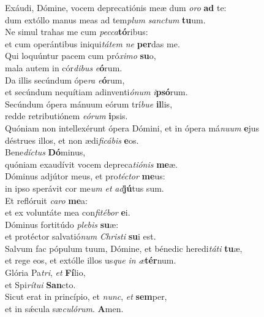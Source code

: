 \evenverse Exáudi, Dómine, vocem deprecatiónis meæ dum \textit{o}\textit{ro} \textbf{ad} te:~\*\\
\evenverse dum extóllo manus meas ad tem\textit{plum} \textit{san}\textit{ctum} \textbf{tu}um.\\
\oddverse Ne simul trahas me cum \textit{pec}\textit{ca}\textbf{tó}ribus:~\*\\
\oddverse et cum operántibus iniqui\textit{tá}\textit{tem} \textit{ne} \textbf{per}das me.\\
\evenverse Qui loquúntur pacem cum pró\textit{xi}\textit{mo} \textbf{su}o,~\*\\
\evenverse mala autem in cór\textit{di}\textit{bus} \textit{e}\textbf{ó}rum.\\
\oddverse Da illis secúndum ópe\textit{ra} \textit{e}\textbf{ó}rum,~\*\\
\oddverse et secúndum nequítiam adinventi\textit{ó}\textit{num} \textit{i}\textbf{psó}rum.\\
\evenverse Secúndum ópera mánuum eórum trí\textit{bu}\textit{e} \textbf{il}lis,~\*\\
\evenverse redde retributiónem \textit{e}\textit{ó}\textit{rum} \textbf{i}psis.\\
\oddverse Quóniam non intellexérunt ópera Dómini, et in ópera má\textit{nu}\textit{um} \textbf{e}jus~\*\\
\oddverse déstrues illos, et non ædi\textit{fi}\textit{cá}\textit{bis} \textbf{e}os.\\
\evenverse Bene\textit{dí}\textit{ctus} \textbf{Dó}minus,~\*\\
\evenverse quóniam exaudívit vocem depreca\textit{ti}\textit{ó}\textit{nis} \textbf{me}æ.\\
\oddverse Dóminus adjútor meus, et pro\textit{té}\textit{ctor} \textbf{me}us:~\*\\
\oddverse in ipso sperávit cor me\textit{um} \textit{et} \textit{ad}\textbf{jú}tus sum.\\
\evenverse Et reflóruit \textit{ca}\textit{ro} \textbf{me}a:~\*\\
\evenverse et ex voluntáte mea con\textit{fi}\textit{té}\textit{bor} \textbf{e}i.\\
\oddverse Dóminus fortitúdo \textit{ple}\textit{bis} \textbf{su}æ:~\*\\
\oddverse et protéctor salvatió\textit{num} \textit{Chri}\textit{sti} \textbf{su}i est.\\
\evenverse Salvum fac pópulum tuum, Dómine, et bénedic heredi\textit{tá}\textit{ti} \textbf{tu}æ,~\*\\
\evenverse et rege eos, et extólle illos us\textit{que} \textit{in} \textit{æ}\textbf{tér}num.\\
\oddverse Glória Pa\textit{tri}, \textit{et} \textbf{Fí}lio,~\*\\
\oddverse et Spi\textit{rí}\textit{tu}\textit{i} \textbf{San}cto.\\
\evenverse Sicut erat in princípio, et \textit{nunc}, \textit{et} \textbf{sem}per,~\*\\
\evenverse et in sǽcula sæ\textit{cu}\textit{ló}\textit{rum}. \textbf{A}men.\\
